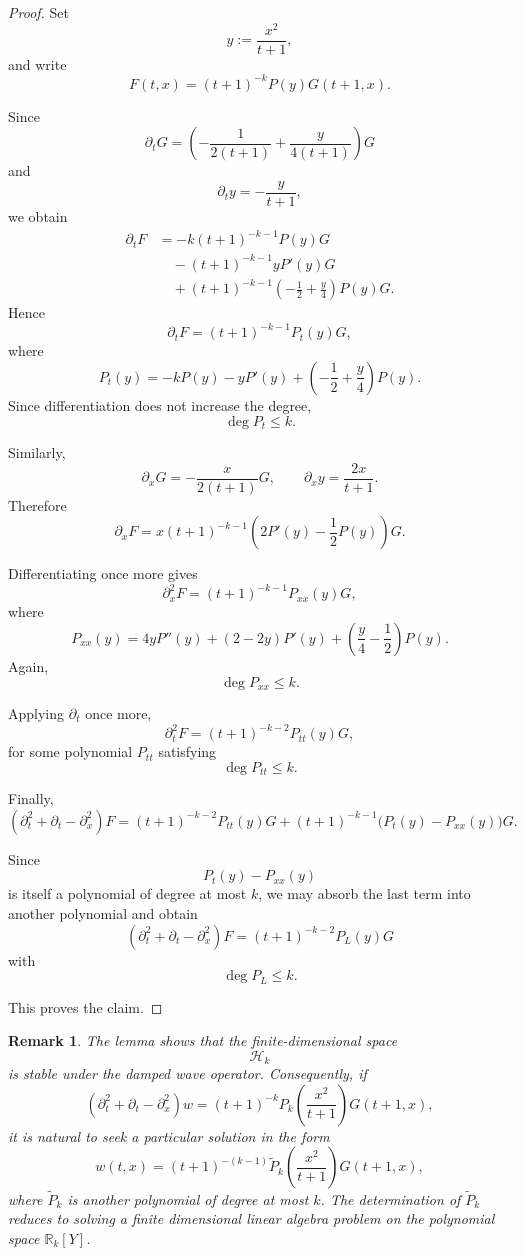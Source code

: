 \documentclass[11pt]{amsart}
\newtheorem{remark}{Remark}[section]
\theoremstyle{definition}
\theoremstyle{remark}
\numberwithin{equation}{section}
\begin{document}
\begin{proof}
Set
\[
y:=\frac{x^2}{t+1},
\]
and write
\[
F(t,x)=(t+1)^{-k}P(y)G(t+1,x).
\]

Since
\[
\partial_tG
=
\left(
-\frac1{2(t+1)}
+\frac{y}{4(t+1)}
\right)
G
\]
and
\[
\partial_ty
=
-\frac{y}{t+1},
\]
we obtain
\begin{align*}
\partial_tF
&=
-k(t+1)^{-k-1}P(y)G
\\
&\quad
-(t+1)^{-k-1}yP'(y)G
\\
&\quad
+(t+1)^{-k-1}
\left(
-\frac12+\frac y4
\right)
P(y)G.
\end{align*}
Hence
\[
\partial_tF
=
(t+1)^{-k-1}
P_t(y)G,
\]
where
\[
P_t(y)
=
-kP(y)-yP'(y)
+
\left(-\frac12+\frac y4\right)P(y).
\]
Since differentiation does not increase the degree,
\[
\deg P_t\le k.
\]

Similarly,
\[
\partial_xG
=
-\frac{x}{2(t+1)}G,
\qquad
\partial_xy
=
\frac{2x}{t+1}.
\]
Therefore
\[
\partial_xF
=
x(t+1)^{-k-1}
\left(
2P'(y)-\frac12P(y)
\right)G.
\]

Differentiating once more gives
\[
\partial_x^2F
=
(t+1)^{-k-1}
P_{xx}(y)G,
\]
where
\[
P_{xx}(y)
=
4yP''(y)
+
(2-2y)P'(y)
+
\left(
\frac y4-\frac12
\right)P(y).
\]
Again,
\[
\deg P_{xx}\le k.
\]

Applying $\partial_t$ once more,
\[
\partial_t^2F
=
(t+1)^{-k-2}
P_{tt}(y)G,
\]
for some polynomial $P_{tt}$ satisfying
\[
\deg P_{tt}\le k.
\]

Finally,
\[
(\partial_t^2+\partial_t-\partial_x^2)F
=
(t+1)^{-k-2}
P_{tt}(y)G
+
(t+1)^{-k-1}
\bigl(P_t(y)-P_{xx}(y)\bigr)G.
\]

Since
\[
P_t(y)-P_{xx}(y)
\]
is itself a polynomial of degree at most $k$, we may absorb the last
term into another polynomial and obtain
\[
(\partial_t^2+\partial_t-\partial_x^2)F
=
(t+1)^{-k-2}
P_L(y)G
\]
with
\[
\deg P_L\le k.
\]

This proves the claim.
\end{proof}

\begin{remark}
The lemma shows that the finite-dimensional space
\[
\mathcal H_k
\]
is stable under the damped wave operator. Consequently, if
\[
(\partial_t^2+\partial_t-\partial_x^2)w
=
(t+1)^{-k}
P_k\!\left(\frac{x^2}{t+1}\right)
G(t+1,x),
\]
it is natural to seek a particular solution in the form
\[
w(t,x)
=
(t+1)^{-(k-1)}
\widetilde P_k
\!\left(\frac{x^2}{t+1}\right)
G(t+1,x),
\]
where $\widetilde P_k$ is another polynomial of degree at most $k$.
The determination of $\widetilde P_k$ reduces to solving a finite
dimensional linear algebra problem on the polynomial space
$\mathbb R_k[Y]$.
\end{remark}
\end{document}
